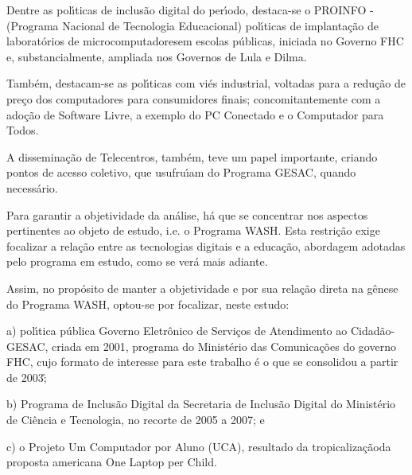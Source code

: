 \documentclass[
12pt,		%
openright,	%
twoside,  %
a4paper,			%
chapter=TITLE,		%
english,			%
french,				%
spanish,			%
brazil				%
]{USPSC-classe/USPSC}
\begin{document}
Dentre as pol\'{\i}ticas de inclus\~ao digital do per\'{\i}odo, destaca-se o  PROINFO - (Programa Nacional de Tecnologia Educacional) pol\'{\i}ticas de implanta\c{c}\~ao de \textquotedbl laborat\'orios de microcomputadores\textquotedbl  em escolas p\'ublicas, iniciada no Governo FHC e, substancialmente, ampliada nos Governos de Lula e Dilma.








Tamb\'em, destacam-se as pol\'{\i}ticas com vi\'es industrial, voltadas para a redu\c{c}\~ao de pre\c{c}o dos computadores para consumidores finais; concomitantemente com a ado\c{c}\~ao de Software Livre, a exemplo do PC Conectado e o Computador para Todos.








A dissemina\c{c}\~ao de Telecentros, tamb\'em, teve um papel importante, criando pontos de acesso coletivo, que usufru\'{\i}am do Programa GESAC, quando necess\'ario.








Para garantir a objetividade da an\'alise, h\'a que se concentrar nos aspectos pertinentes ao objeto de estudo, i.e. o Programa WASH. Esta restri\c{c}\~ao exige focalizar a rela\c{c}\~ao entre as tecnologias digitais e a educa\c{c}\~ao, abordagem adotadas pelo programa em estudo, como se ver\'a mais adiante.








Assim, no prop\'osito de manter a objetividade e por sua rela\c{c}\~ao direta na g\^enese do Programa WASH, optou-se por focalizar, neste estudo:









\begin{alineas}
\item a) pol\'{\i}tica p\'ublica \textquotedbl Governo Eletr\^onico de Servi\c{c}os de Atendimento ao Cidad\~ao-GESAC\textquotedbl , criada em 2001, programa do Minist\'erio das Comunica\c{c}\~oes do governo FHC, cujo formato de interesse para este trabalho \'e o que se consolidou a partir de 2003;\r\n
\item b) Programa de Inclus\~ao Digital da Secretaria de Inclus\~ao Digital do Minist\'erio de Ci\^encia e Tecnologia, no recorte de 2005 a 2007; e
\item c) o Projeto Um Computador por Aluno (UCA), resultado da \textquotedbl tropicaliza\c{c}\~ao\textquotedbl  da proposta americana \textquotedbl One Laptop per Child\textquotedbl .
\end{alineas}
\end{document}
